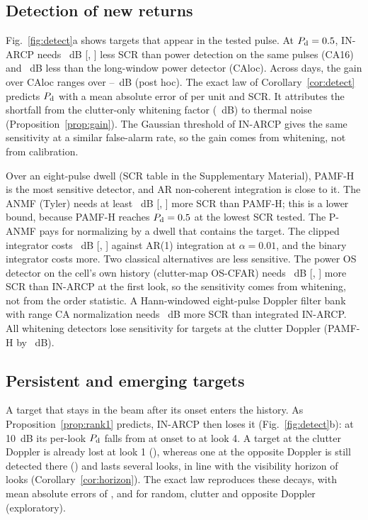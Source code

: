 \documentclass[journal]{IEEEtran}
\begin{document}
\subsection{Detection of new returns}\label{sec:detect}
Fig.~\ref{fig:detect}a shows targets that appear in the tested pulse. At $P_{\rm d}=0.5$, IN-ARCP needs \DetINGainCAHalf~dB [\DetINGainCALoHalf, \DetINGainCAHiHalf] less SCR than power detection on the same pulses (CA16) and \DetINGainLocHalf~dB less than the long-window power detector (CAloc). Across days, the gain over CAloc ranges over \DayGainMin--\DayGainMax~dB (post hoc). The exact law of Corollary~\ref{cor:detect} predicts $P_{\rm d}$ with a mean absolute error of \DetMae{} per unit and SCR. It attributes the shortfall from the clutter-only whitening factor (\DetNaiveGain~dB) to thermal noise (Proposition~\ref{prop:gain}). The Gaussian threshold of IN-ARCP gives the same sensitivity at a similar false-alarm rate, so the gain comes from whitening, not from calibration.

Over an eight-pulse dwell (SCR table in the Supplementary Material), PAMF-H is the most sensitive detector, and AR non-coherent integration is close to it. The ANMF (Tyler) needs at least \AFpMinusPamf~dB [\AFpMinusPamfLo, \AFpMinusPamfHi] more SCR than PAMF-H; this is a lower bound, because PAMF-H reaches $P_{\rm d}=0.5$ at the lowest SCR tested. The P-ANMF pays for normalizing by a dwell that contains the target. The clipped integrator costs \AClipMinusDin~dB [\AClipMinusDinLo, \AClipMinusDinHi] against AR(1) integration at $\alpha=0.01$, and the binary integrator costs more. Two classical alternatives are less sensitive. The power OS detector on the cell's own history (clutter-map OS-CFAR) needs \AOsrawMinusIn~dB [\AOsrawMinusInLo, \AOsrawMinusInHi] more SCR than IN-ARCP at the first look, so the sensitivity comes from whitening, not from the order statistic. A Hann-windowed eight-pulse Doppler filter bank with range CA normalization needs \ClINvsMTD~dB more SCR than integrated IN-ARCP. All whitening detectors lose sensitivity for targets at the clutter Doppler (PAMF-H by \ClPAMFMatched~dB).

\subsection{Persistent and emerging targets}\label{sec:onset}
A target that stays in the beam after its onset enters the history. As Proposition~\ref{prop:rank1} predicts, IN-ARCP then loses it (Fig.~\ref{fig:detect}b): at 10~dB its per-look $P_{\rm d}$ falls from \OnLookZero{} at onset to \OnLookFour{} at look 4. A target at the clutter Doppler is already lost at look 1 (\OnMatchedOne), whereas one at the opposite Doppler is still detected there (\OnOppOne) and lasts several looks, in line with the visibility horizon of \ThHorizonOpp{} looks (Corollary~\ref{cor:horizon}). The exact law reproduces these decays, with mean absolute errors of \OnTheoryMaeRand, \OnTheoryMaeMatch{} and \OnTheoryMaeOpp{} for random, clutter and opposite Doppler (exploratory).
\end{document}
